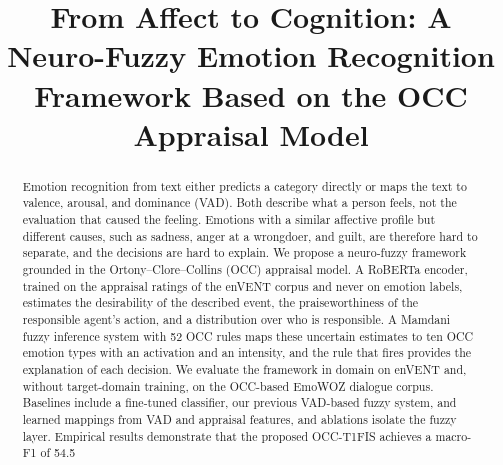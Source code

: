 \documentclass[conference, a4paper]{IEEEtran}
\begin{document}
\title{From Affect to Cognition: A Neuro-Fuzzy Emotion Recognition Framework Based on the OCC Appraisal Model}

\author{
\and
{}
\and
{}
\and
{}
}

\maketitle

\begin{abstract}
Emotion recognition from text either predicts a category directly or maps the text to valence, arousal, and dominance (VAD). Both describe what a person feels, not the evaluation that caused the feeling. Emotions with a similar affective profile but different causes, such as sadness, anger at a wrongdoer, and guilt, are therefore hard to separate, and the decisions are hard to explain. We propose a neuro-fuzzy framework grounded in the Ortony--Clore--Collins (OCC) appraisal model. A RoBERTa encoder, trained on the appraisal ratings of the enVENT corpus and never on emotion labels, estimates the desirability of the described event, the praiseworthiness of the responsible agent's action, and a distribution over who is responsible. A Mamdani fuzzy inference system with 52 OCC rules maps these uncertain estimates to ten OCC emotion types with an activation and an intensity, and the rule that fires provides the explanation of each decision. We evaluate the framework in domain on enVENT and, without target-domain training, on the OCC-based EmoWOZ dialogue corpus. Baselines include a fine-tuned classifier, our previous VAD-based fuzzy system, and learned mappings from VAD and appraisal features, and ablations isolate the fuzzy layer. Empirical results demonstrate that the proposed OCC-T1FIS achieves a macro-F1 of 54.5%
\end{abstract}
\end{document}
